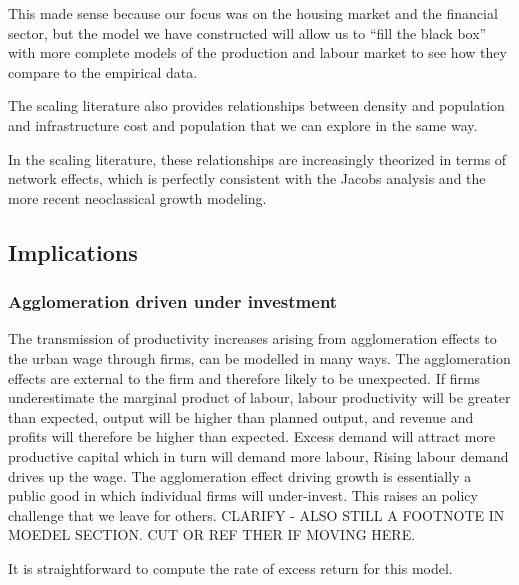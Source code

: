 This made sense because our focus  was on the housing market and the financial sector, but the model we have constructed will allow us to ``fill the black box'' with more complete models of the production and labour market to see how they compare to the empirical data. 

The  scaling  literature also provides relationships between density and population and infrastructure cost and population that we can explore in the same way.

In the scaling literature, these relationships are increasingly theorized in terms of network effects, which is perfectly consistent with the Jacobs analysis and the more recent neoclassical growth modeling.


\subsection{Implications}
\subsubsection{Agglomeration driven under investment}
The transmission of productivity increases arising from agglomeration effects  to the urban wage through firms, can be modelled in many ways. The agglomeration effects are external to the firm and therefore likely to be unexpected. If  firms underestimate the marginal product of labour, labour productivity will be greater than expected, output will be higher than planned output, and revenue and profits will therefore be higher than expected. Excess demand will attract more productive capital which in turn will demand more labour,  Rising labour demand drives up the wage. The agglomeration effect driving growth is essentially a public good in which individual firms will under-invest. This raises an policy challenge that we leave for others. CLARIFY - ALSO STILL A FOOTNOTE IN MOEDEL SECTION. CUT OR REF THER IF MOVING HERE.

 It is straightforward to compute the rate of excess return for  this model. 

